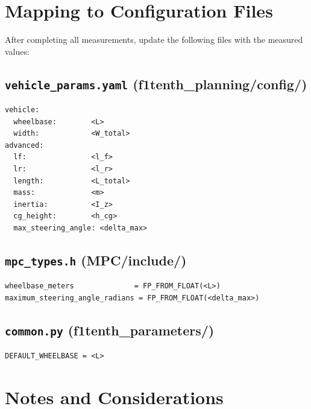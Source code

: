 \documentclass[a4paper,11pt]{article}
\begin{document}
\section{Mapping to Configuration Files}
\label{sec:config}

After completing all measurements, update the following files with the
measured values:

\subsection{\texttt{vehicle\_params.yaml}
  \normalfont(f1tenth\_planning/config/)}
\begin{verbatim}
vehicle:
  wheelbase:        <L>
  width:            <W_total>
advanced:
  lf:               <l_f>
  lr:               <l_r>
  length:           <L_total>
  mass:             <m>
  inertia:          <I_z>
  cg_height:        <h_cg>
  max_steering_angle: <delta_max>
\end{verbatim}

\subsection{\texttt{mpc\_types.h} \normalfont(MPC/include/)}
\begin{verbatim}
wheelbase_meters              = FP_FROM_FLOAT(<L>)
maximum_steering_angle_radians = FP_FROM_FLOAT(<delta_max>)
\end{verbatim}

\subsection{\texttt{common.py} \normalfont(f1tenth\_parameters/)}
\begin{verbatim}
DEFAULT_WHEELBASE = <L>
\end{verbatim}

\section{Notes and Considerations}
\end{document}
